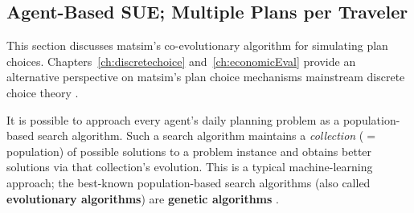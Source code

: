 \subsection{Agent-Based SUE; Multiple Plans per Traveler}
\label{sec:agent-based-sue}

This section discusses \gls{matsim}'s co-evolutionary algorithm for simulating
plan choices. Chapters~\ref{ch:discretechoice} and~\ref{ch:economicEval} 
provide an alternative perspective on \gls{matsim}'s plan choice mechanisms
 mainstream discrete choice theory
\citep{BenAkivaLerman_1985}.

% 

It is possible to approach every agent's daily
planning problem as a population-based search algorithm.  Such a
search algorithm maintains a \emph{collection} ($=$ population) of
possible solutions to a problem instance and obtains better solutions
via that collection's evolution.  This is a typical
machine-learning \citep[e.g.,][]{RussellNorvigBook} approach; the best-known
population-based search algorithms (also called \textbf{evolutionary
algorithms}) are \textbf{genetic algorithms} \citep[e.g.,][]{Goldberg_1989}.

